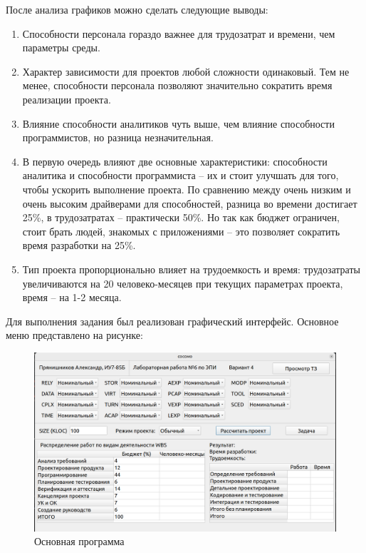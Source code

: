 После анализа графиков можно сделать следующие выводы:
\begin{enumerate}
	\item Способности персонала гораздо важнее для трудозатрат и времени, чем параметры среды.
	\item Характер зависимости для проектов любой сложности одинаковый. Тем не менее, способности персонала позволяют значительно сократить время реализации проекта.
	\item Влияние способности аналитиков чуть выше, чем влияние способности программистов, но разница незначительная.
	\item В первую очередь влияют две основные характеристики: способности аналитика и способности программиста -- их и стоит улучшать для того, чтобы ускорить выполнение проекта. 
	По сравнению между очень низким и очень высоким драйверами для способностей, разница во времени достигает 25\%, в трудозатратах -- практически 50\%.
	Но так как бюджет ограничен, стоит брать людей, знакомых с приложениями -- это позволяет сократить время разработки на 25\%.
	\item Тип проекта пропорционально влияет на трудоемкость и время: трудозатраты увеличиваются на 20 человеко-месяцев при текущих параметрах проекта, время -- на 1-2 месяца.
\end{enumerate}
Для выполнения задания был реализован графический интерфейс.
Основное меню представлено на рисунке:
\FloatBarrier
\begin{figure}[h]	
	\begin{center}
		\includegraphics[width=\linewidth]{inc/prog.png}
	\end{center}
	\captionsetup{justification=centering}
	\caption{Основная программа}
\end{figure}
\FloatBarrier

